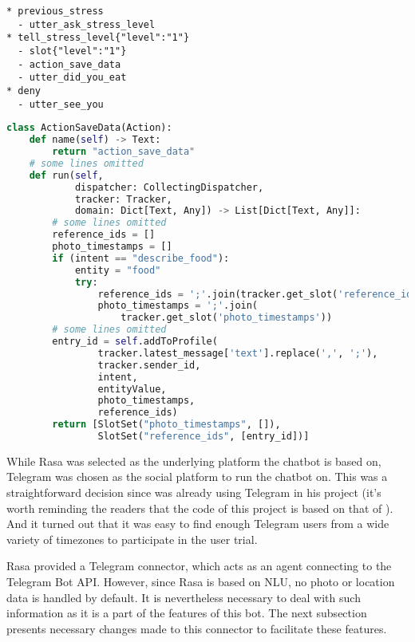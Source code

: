 \begin{lstlisting}[label={story_slot},caption={Using slots in stories to save user's stress level},captionpos=b]
* previous_stress
  - utter_ask_stress_level
* tell_stress_level{"level":"1"}
  - slot{"level":"1"}
  - action_save_data
  - utter_did_you_eat
* deny
  - utter_see_you
\end{lstlisting}

\bigskip
\begin{lstlisting}[label={action_slot},caption={Getting and setting slots in a custom action to relate entries in persistent data. "photo\_timestamps" and "reference\_ids" are used to find the correct photos to be send to the user in the future\, which help the user to reflect food.},language=Python,captionpos=b]
class ActionSaveData(Action):
    def name(self) -> Text:
        return "action_save_data"
    # some lines omitted
    def run(self,
            dispatcher: CollectingDispatcher,
            tracker: Tracker,
            domain: Dict[Text, Any]) -> List[Dict[Text, Any]]:
        # some lines omitted
        reference_ids = []
        photo_timestamps = []
        if (intent == "describe_food"):
            entity = "food"
            try:
                reference_ids = ';'.join(tracker.get_slot('reference_ids'))
                photo_timestamps = ';'.join(
                    tracker.get_slot('photo_timestamps'))
        # some lines omitted
        entry_id = self.addToProfile(
                tracker.latest_message['text'].replace(',', ';'),
                tracker.sender_id,
                intent,
                entityValue,
                photo_timestamps,
                reference_ids)
        return [SlotSet("photo_timestamps", []),
                SlotSet("reference_ids", [entry_id])]
\end{lstlisting}

\bigskip
While Rasa was selected as the underlying platform the chatbot is based on, Telegram was chosen as the social platform to run the chatbot on. This was a straightforward decision since \citeauthor{17_ludwig} was already using Telegram in his project (it's worth reminding the readers that the code of this project is based on that of \citeauthor{17_ludwig}). And it turned out that it was easy to find enough Telegram users from a wide variety of timezones to participate in the user trial.

Rasa provided a Telegram connector, which acts as an agent connecting to the Telegram Bot API. However, since Rasa is based on NLU, no photo or location data is handled by default. It is nevertheless necessary to deal with such information as it is a part of the features of this bot. The next subsection presents necessary changes made to this connector to facilitate these features.

